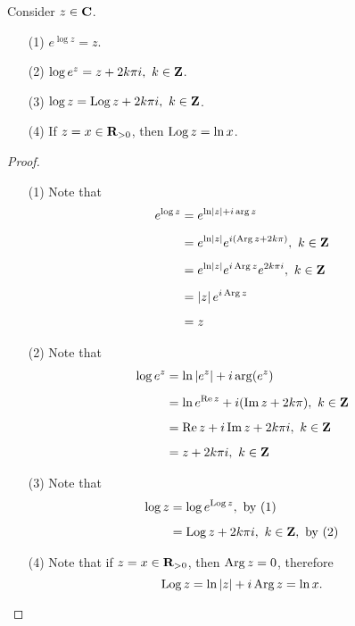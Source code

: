 \begin{proposition}\label{proplog}
Consider $z \in \mathbf C$. 
\begin{itemize}
\item[(1)] $e^{\log z} = z$.
\item[(2)] $\log e^z = z + 2k\pi i,\ k \in \mathbf Z$.
\item[(3)] $\log z = \operatorname{Log} z + 2k\pi i,\ k \in \mathbf Z$.
\item[(4)] If $z = x \in \mathbf R_{>0}$, then $\operatorname{Log} z = \ln x$.
\end{itemize}
\end{proposition}
\begin{proof}\hfill
\begin{itemize}
\item[(1)] Note that 
\begin{align*}
e^{\log z} &= e^{\ln\left\lvert z\right\rvert + i\arg z}\\[0.5em]
&= e^{\ln\left\lvert z\right\rvert}e^{i(\operatorname{Arg} z + 2k\pi)},\ k \in \mathbf Z\\[0.5em]
&= e^{\ln\left\lvert z\right\rvert}e^{i\operatorname{Arg} z}e^{2k\pi i},\ k \in \mathbf Z\\[0.5em]
&= \left\lvert z\right\rvert e^{i\operatorname{Arg} z}\\[0.5em]
&= z
\end{align*}
\item[(2)] Note that 
\begin{align*}
\log e^z &= \ln\left\lvert e^z\right\rvert + i\arg(e^z)\\[0.5em]
&= \ln e^{\operatorname{Re} z} + i(\operatorname{Im} z + 2k\pi),\ k \in \mathbf Z\\[0.5em]
&= \operatorname{Re} z + i\operatorname{Im} z + 2k\pi i,\ k \in \mathbf Z\\[0.5em]
&= z + 2k\pi i,\ k \in \mathbf Z
\end{align*}
\item[(3)] Note that
\begin{align*}
\log z &= \log e^{\operatorname{Log} z},\ \text{by (1)}\\[0.5em]
&= \operatorname{Log} z + 2k\pi i,\ k \in \mathbf Z,\ \text{by (2)}
\end{align*}
\item[(4)] Note that if $z = x \in \mathbf R_{>0}$, then $\operatorname{Arg} z = 0$, therefore
\[\operatorname{Log} z = \ln\left\lvert z\right\rvert + i\operatorname{Arg} z = \ln x.\]
\end{itemize}
\vspace*{-\baselineskip}
\end{proof}

\medskip

